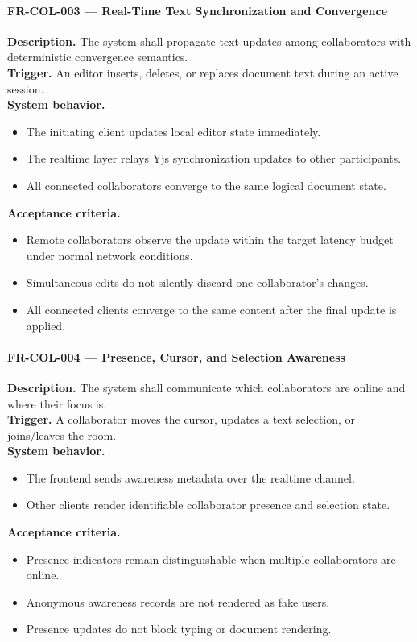 \paragraph{FR-COL-003 --- Real-Time Text Synchronization and Convergence}
\textbf{Description.} The system shall propagate text updates among collaborators with deterministic
convergence semantics.\\
\textbf{Trigger.} An editor inserts, deletes, or replaces document text during an active session.\\
\textbf{System behavior.}
\begin{itemize}
  \item The initiating client updates local editor state immediately.
  \item The realtime layer relays Yjs synchronization updates to other participants.
  \item All connected collaborators converge to the same logical document state.
\end{itemize}
\textbf{Acceptance criteria.}
\begin{itemize}
  \item Remote collaborators observe the update within the target latency budget under normal network conditions.
  \item Simultaneous edits do not silently discard one collaborator's changes.
  \item All connected clients converge to the same content after the final update is applied.
\end{itemize}

\paragraph{FR-COL-004 --- Presence, Cursor, and Selection Awareness}
\textbf{Description.} The system shall communicate which collaborators are online and where their focus is.\\
\textbf{Trigger.} A collaborator moves the cursor, updates a text selection, or joins/leaves the room.\\
\textbf{System behavior.}
\begin{itemize}
  \item The frontend sends awareness metadata over the realtime channel.
  \item Other clients render identifiable collaborator presence and selection state.
\end{itemize}
\textbf{Acceptance criteria.}
\begin{itemize}
  \item Presence indicators remain distinguishable when multiple collaborators are online.
  \item Anonymous awareness records are not rendered as fake users.
  \item Presence updates do not block typing or document rendering.
\end{itemize}

